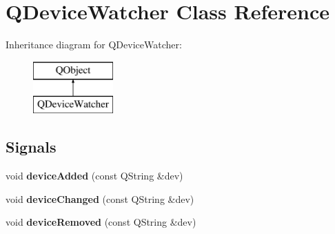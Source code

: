 \hypertarget{class_q_device_watcher}{}\section{Q\+Device\+Watcher Class Reference}
\label{class_q_device_watcher}
Inheritance diagram for Q\+Device\+Watcher\+:\begin{figure}[H]
\begin{center}
\leavevmode
\includegraphics[height=2.000000cm]{class_q_device_watcher}
\end{center}
\end{figure}
\subsection*{Signals}
\begin{DoxyCompactItemize}
\item 
\mbox{\label{class_q_device_watcher_a6a8beb54ff1878ab108fd493fcb3b95b}} 
void {\bfseries device\+Added} (const Q\+String \&dev)
\item 
\mbox{\label{class_q_device_watcher_ad1ee56690aa510e6c796f9faa46e01d3}} 
void {\bfseries device\+Changed} (const Q\+String \&dev)
\item 
\mbox{\label{class_q_device_watcher_af9b00d02f2e9fe8db464a63d58965948}} 
void {\bfseries device\+Removed} (const Q\+String \&dev)
\end{DoxyCompactItemize}

